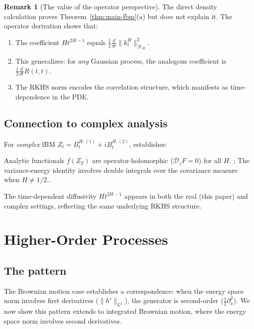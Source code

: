 \documentclass[11pt]{article}
\theoremstyle{definition}
\newtheorem{remark}[theorem]{Remark}
\newcommand{\Hi}{\mathcal{H}}
\begin{document}
\begin{remark}[The value of the operator perspective]
The direct density calculation proves Theorem~\ref{thm:main-fbm}(a) but does not explain it. The operator derivation shows that:
\begin{enumerate}
\item The coefficient $Ht^{2H-1}$ equals $\frac{1}{2}\frac{d}{dt}\|k^H_t\|^2_{\Hi_H}$.
\item This generalizes: for \emph{any} Gaussian process, the analogous coefficient is $\frac{1}{2}\frac{d}{dt}R(t,t)$.
\item The RKHS norm encodes the correlation structure, which manifests as time-dependence in the PDE.
\end{enumerate}
\end{remark}

\subsection{Connection to complex analysis}

For \emph{complex} fBM $Z_t = B^{H,(1)}_t + i B^{H,(2)}_t$, \cite{PaperV} establishes:

Analytic functionals $f(Z_T)$ are operator-holomorphic ($\mathcal{D}_{\bar{z}} F = 0$) for all $H$. ; The variance-energy identity involves double integrals over the covariance measure when $H \neq 1/2$..

The time-dependent diffusivity $Ht^{2H-1}$ appears in both the real (this paper) and complex \cite{PaperV} settings, reflecting the same underlying RKHS structure.

\section{Higher-Order Processes}\label{sec:higher}

\subsection{The pattern}

The Brownian motion case establishes a correspondence: when the energy space norm involves first derivatives ($\|h'\|_{L^2}$), the generator is second-order ($\frac{1}{2}\partial_x^2$). We now show this pattern extends to integrated Brownian motion, where the energy space norm involves second derivatives.
\end{document}
